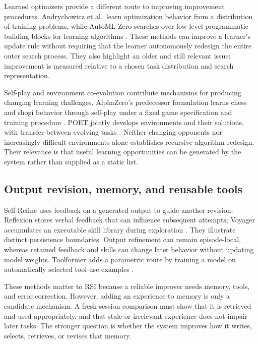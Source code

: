 \documentclass[11pt,american,]{article}
\begin{document}
Learned optimizers provide a different route to improving improvement
procedures. Andrychowicz et al.~learn optimization behavior from a
distribution of training problems, while AutoML-Zero searches over
low-level programmatic building blocks for learning algorithms
\citep{learnoptimizer2016, automlzero2020}. These methods can improve a
learner's update rule without requiring that the learner autonomously
redesign the entire outer search process. They also highlight an older
and still relevant issue: improvement is measured relative to a chosen
task distribution and search representation.

Self-play and environment co-evolution contribute mechanisms for
producing changing learning challenges. AlphaZero's predecessor
formulation learns chess and shogi behavior through self-play under a
fixed game specification and training procedure \citep{alphazero2017}.
POET jointly develops environments and their solutions, with transfer
between evolving tasks \citep{poet2019}. Neither changing opponents nor
increasingly difficult environments alone establishes recursive
algorithm redesign. Their relevance is that useful learning
opportunities can be generated by the system rather than supplied as a
static list.

\hypertarget{output-revision-memory-and-reusable-tools}{%
\subsection{Output revision, memory, and reusable
tools}\label{output-revision-memory-and-reusable-tools}}

Self-Refine uses feedback on a generated output to guide another
revision; Reflexion stores verbal feedback that can influence subsequent
attempts; Voyager accumulates an executable skill library during
exploration \citep{selfrefine2023, reflexion2023, voyager2023}. They
illustrate distinct persistence boundaries. Output refinement can remain
episode-local, whereas retained feedback and skills can change later
behavior without updating model weights. Toolformer adds a parametric
route by training a model on automatically selected tool-use examples
\citep{toolformer2023}.

These methods matter to RSI because a reliable improver needs memory,
tools, and error correction. However, adding an experience to memory is
only a candidate mechanism. A fresh-session comparison must show that it
is retrieved and used appropriately, and that stale or irrelevant
experience does not impair later tasks. The stronger question is whether
the system improves how it writes, selects, retrieves, or revises that
memory.
\end{document}
